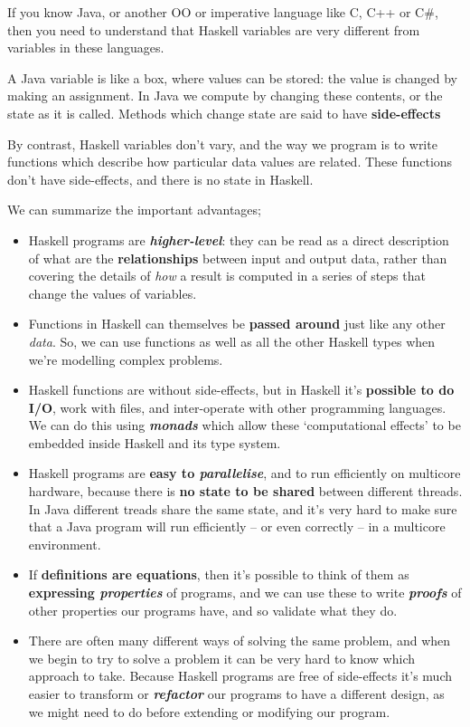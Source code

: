 \documentclass[tikz,border=10pt]{project_plan}
\begin{document}
If you know Java, or another OO or imperative language like C, C++ or C\#, then
you need to understand that Haskell variables are very different from variables in
these languages.

A Java variable is like a box, where values can be stored: the value is
changed by making an assignment. In Java we compute by changing these contents,
or the state as it is called. Methods which change state are said to have \textbf{side-effects}

By contrast, Haskell variables don’t vary, and the way we program is to write
functions which describe how particular data values are related. These functions
don’t have side-effects, and there is no state in Haskell.

We can summarize the important advantages;
\begin{itemize}
  \item Haskell programs are \textbf{\textit{higher-level}}: they can be read as a direct description of
        what are the \textbf{relationships} between input and output data, rather than covering
        the details of \textit{how} a result is computed in a series of steps that change the
        values of variables.
  \item Functions in Haskell can themselves be \textbf{passed around} just like any other \textit{data}.
        So, we can use functions as well as all the other Haskell types when we’re modelling complex problems.
  \item Haskell functions are without side-effects, but in Haskell it’s \textbf{possible to do I/O},
        work with files, and inter-operate with other programming languages. We can
        do this using \textbf{\textit{monads}} which allow these ‘computational effects’ to be
        embedded inside Haskell and its type system.
  \item Haskell programs are \textbf{easy to \textit{parallelise}}, and to run efficiently on multicore
        hardware, because there is \textbf{no state to be shared} between different threads.
        In Java different treads share the same state, and it’s very hard to make sure
        that a Java program will run efficiently – or even correctly – in a multicore
        environment.
  \item If \textbf{definitions are equations}, then it’s possible to think of them as \textbf{expressing
          \textit{properties}} of programs, and we can use these to write \textbf{\textit{proofs}} of other properties
        our programs have, and so validate what they do.
  \item There are often many different ways of solving the same problem, and when
        we begin to try to solve a problem it can be very hard to know which approach
        to take. Because Haskell programs are free of side-effects it’s much easier to
        transform or \textbf{\textit{refactor}} our programs to have a different design, as we might
        need to do before extending or modifying our program.
\end{itemize}
\end{document}
